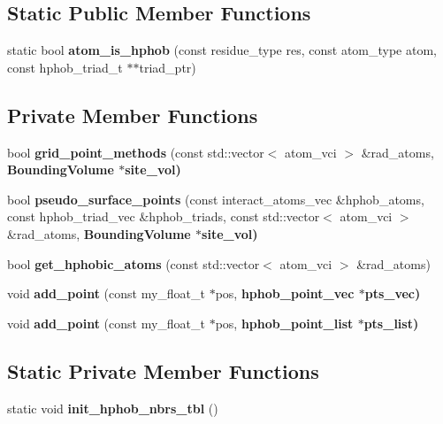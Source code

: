 \subsection*{Static Public Member Functions}
\begin{CompactItemize}
\item 
static bool \textbf{atom\_\-is\_\-hphob} (const residue\_\-type res, const atom\_\-type atom, const hphob\_\-triad\_\-t $\ast$$\ast$triad\_\-ptr)\label{classSimSite3D_1_1HphobPoints_f0aded6fe4d43082ae2eec98b78e4c8b}

\end{CompactItemize}
\subsection*{Private Member Functions}
\begin{CompactItemize}
\item 
bool \textbf{grid\_\-point\_\-methods} (const std::vector$<$ atom\_\-vci $>$ \&rad\_\-atoms, \bf{Bounding\-Volume} $\ast$site\_\-vol)\label{classSimSite3D_1_1HphobPoints_e735089461a76a86bda11000aa4ee0e7}

\item 
bool \textbf{pseudo\_\-surface\_\-points} (const interact\_\-atoms\_\-vec \&hphob\_\-atoms, const hphob\_\-triad\_\-vec \&hphob\_\-triads, const std::vector$<$ atom\_\-vci $>$ \&rad\_\-atoms, \bf{Bounding\-Volume} $\ast$site\_\-vol)\label{classSimSite3D_1_1HphobPoints_6d66bc1b44810ac36026c71f7eebcbeb}

\item 
bool \textbf{get\_\-hphobic\_\-atoms} (const std::vector$<$ atom\_\-vci $>$ \&rad\_\-atoms)\label{classSimSite3D_1_1HphobPoints_8f92e0433c19f069aef713485e1e60d7}

\item 
void \textbf{add\_\-point} (const my\_\-float\_\-t $\ast$pos, \bf{hphob\_\-point\_\-vec} $\ast$pts\_\-vec)\label{classSimSite3D_1_1HphobPoints_ce1ced666cfe3a8dd21195605609af1d}

\item 
void \textbf{add\_\-point} (const my\_\-float\_\-t $\ast$pos, \bf{hphob\_\-point\_\-list} $\ast$pts\_\-list)\label{classSimSite3D_1_1HphobPoints_8b20d2a672fc333c8ea5be0f1edf3bcc}

\end{CompactItemize}
\subsection*{Static Private Member Functions}
\begin{CompactItemize}
\item 
static void \textbf{init\_\-hphob\_\-nbrs\_\-tbl} ()\label{classSimSite3D_1_1HphobPoints_370c8b40fcd5b0ff04da11eac6697463}

\end{CompactItemize}
